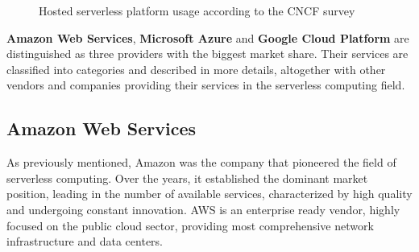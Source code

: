 \begin{figure}[h]
    \caption{Hosted serverless platform usage according to the CNCF survey \cite{CNCFServerlessSurvey2020}}
    \label{fig:hosted-serverless-platform-share-survey}
\end{figure}

\textbf{Amazon Web Services}, \textbf{Microsoft Azure} and \textbf{Google Cloud Platform} are distinguished as three providers with the biggest market share. Their services are classified into categories and described in more details, altogether with other vendors and companies providing their services in the serverless computing field.

\subsection{Amazon Web Services} \label{serverless-amazon-web-services}

As previously mentioned, Amazon was the company that pioneered the field of serverless computing. Over the years, it established the dominant market position, leading in the number of available services, characterized by high quality and undergoing constant innovation. AWS is an enterprise ready vendor, highly focused on the public cloud sector, providing most comprehensive network infrastructure and data centers.

